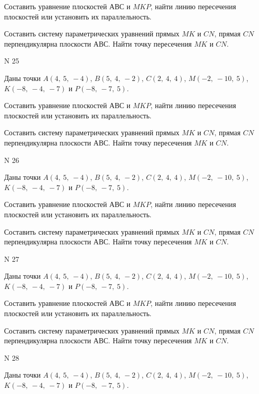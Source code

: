 \documentclass[11pt]{report}
\begin{document}
Составить уравнение плоскостей $АВС$ и $MKP$,
найти линию пересечения плоскостей или установить их параллельность.

Составить систему параметрических уравнений прямых $MK$ и $CN$,
прямая $CN$ перпендикулярна плоскости $АВС$. 
Найти точку пересечения $MK$ и $CN$.



 N 25

Даны точки $A\left( 4, \  5, \  -4\right)$, $B\left( 5, \  4, \  -2\right)$, $C\left( 2, \  4, \  4\right)$, $M\left( -2, \  -10, \  5\right)$, $K\left( -8, \  -4, \  -7\right)$ и $P\left( -8, \  -7, \  5\right)$.


Составить уравнение плоскостей $АВС$ и $MKP$,
найти линию пересечения плоскостей или установить их параллельность.

Составить систему параметрических уравнений прямых $MK$ и $CN$,
прямая $CN$ перпендикулярна плоскости $АВС$. 
Найти точку пересечения $MK$ и $CN$.



 N 26

Даны точки $A\left( 4, \  5, \  -4\right)$, $B\left( 5, \  4, \  -2\right)$, $C\left( 2, \  4, \  4\right)$, $M\left( -2, \  -10, \  5\right)$, $K\left( -8, \  -4, \  -7\right)$ и $P\left( -8, \  -7, \  5\right)$.


Составить уравнение плоскостей $АВС$ и $MKP$,
найти линию пересечения плоскостей или установить их параллельность.

Составить систему параметрических уравнений прямых $MK$ и $CN$,
прямая $CN$ перпендикулярна плоскости $АВС$. 
Найти точку пересечения $MK$ и $CN$.



 N 27

Даны точки $A\left( 4, \  5, \  -4\right)$, $B\left( 5, \  4, \  -2\right)$, $C\left( 2, \  4, \  4\right)$, $M\left( -2, \  -10, \  5\right)$, $K\left( -8, \  -4, \  -7\right)$ и $P\left( -8, \  -7, \  5\right)$.


Составить уравнение плоскостей $АВС$ и $MKP$,
найти линию пересечения плоскостей или установить их параллельность.

Составить систему параметрических уравнений прямых $MK$ и $CN$,
прямая $CN$ перпендикулярна плоскости $АВС$. 
Найти точку пересечения $MK$ и $CN$.



 N 28

Даны точки $A\left( 4, \  5, \  -4\right)$, $B\left( 5, \  4, \  -2\right)$, $C\left( 2, \  4, \  4\right)$, $M\left( -2, \  -10, \  5\right)$, $K\left( -8, \  -4, \  -7\right)$ и $P\left( -8, \  -7, \  5\right)$.
\end{document}
